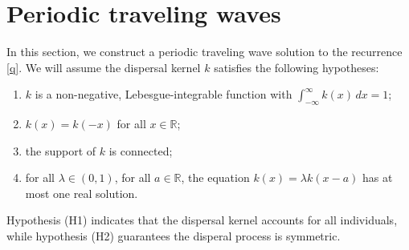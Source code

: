 \documentclass[11pt]{article}
\theoremstyle{definition}
\newtheorem{rem}[thm]{Remark}
\numberwithin{equation}{section}
\numberwithin{thm}{section}
\begin{document}
\section{Periodic traveling waves}

In this section, we construct a periodic traveling wave solution to the recurrence \eqref{q}. We will assume the dispersal kernel $k$ satisfies the following hypotheses:

\def\Hone{(\text{H1})}
\def\Htwo{(\text{H2})}
\def\Hthree{(\text{H3})}
\def\Hfour{(\text{H4})}


\begin{enumerate}[(H1)]
\item $k$ is a non-negative, Lebesgue-integrable function with $\int_{-\infty}^{\infty} k(x) \, dx = 1$;

\item $k(x)=k(-x)$ for all $x\in\mathbb R$;

\item the support of $k$ is connected;

\item  for all $\lambda\in(0,1)$, for all $a\in\mathbb R$, the equation $k(x)=\lambda k(x-a)$ has at most one real solution.
\end{enumerate}

Hypothesis (H1) indicates that the dispersal kernel accounts for all individuals, while hypothesis (H2) guarantees the disperal process is symmetric.


\end{document}
